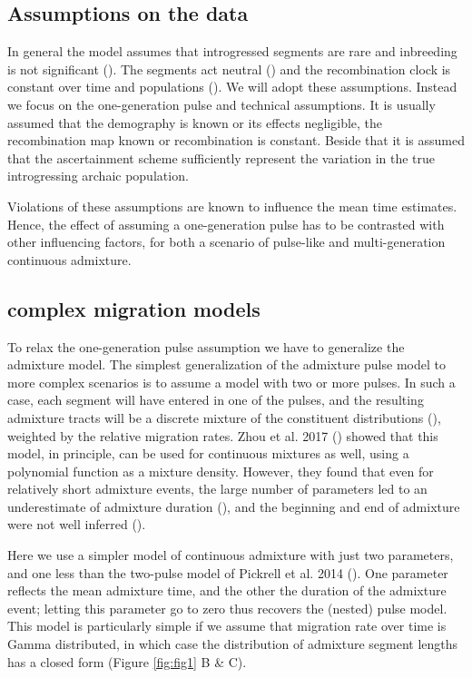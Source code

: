 \documentclass[]{article}
\begin{document}
\subsection{Assumptions on the data}\label{assumptions-on-the-data}

In general the model assumes that introgressed segments are rare and inbreeding is not significant (\cite{pool_inference_2009}). The segments act neutral (\cite{shchur_distribution_2019}) and the recombination clock is constant over time and populations (\cite{gravel_population_2012}). We will adopt these assumptions. Instead we focus on the one-generation pulse and technical assumptions. It is usually assumed that the demography is known or its effects negligible, the recombination map known or recombination is constant. Beside that it is assumed that the ascertainment scheme sufficiently represent the variation in the true introgressing archaic population.

Violations of these assumptions are known to influence the mean time
estimates. Hence, the effect of assuming a one-generation pulse has to
be contrasted with other influencing factors, for both a scenario of
pulse-like and multi-generation continuous admixture. 


\subsection{complex migration models}

To relax the one-generation pulse assumption we have to generalize the admixture model.
The simplest generalization of the admixture pulse model to more complex scenarios is to assume a model with two or more pulses. In such a case,  each segment will have entered in one of the pulses, and the resulting admixture tracts will be a discrete mixture of the constituent distributions (\cite{pickrell_ancient_2014}), weighted by the relative migration rates. Zhou et al. 2017 (\cite{zhou_modeling_2017}) showed that this model, in principle, can be used for continuous mixtures as well, using a polynomial function as a mixture density. However, they found that even for relatively short admixture events, the large number of parameters led to an underestimate of admixture duration (\cite{zhou_inference_2017}), and the beginning and end of admixture were not well inferred
(\cite{zhou_modeling_2017,zhou_inference_2017}). 

Here we use a simpler model of continuous admixture with just two parameters, and one less than the two-pulse model of Pickrell et al. 2014 (\cite{pickrell_ancient_2014}). One parameter reflects the mean admixture time, and the other the duration of the admixture event; letting this parameter go to zero thus recovers the (nested) pulse model. 
This model is particularly simple if we assume that migration rate over time is Gamma distributed, in which case the distribution of admixture segment lengths has a closed form (Figure \ref{fig:fig1} B & C).
\end{document}
